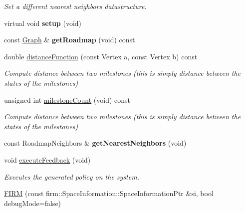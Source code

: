 \begin{DoxyCompactItemize}
\begin{DoxyCompactList}\small\item\em \-Set a different nearest neighbors datastructure. \end{DoxyCompactList}\item 
\hypertarget{class_f_i_r_m_a5c5c1fff3029a554dfddfd95bed17b10}{virtual void {\bfseries setup} (void)}\label{class_f_i_r_m_a5c5c1fff3029a554dfddfd95bed17b10}

\item 
\hypertarget{class_f_i_r_m_aacad0b0dfc1413f78c6dc76fdbac9ce7}{const \hyperlink{class_f_i_r_m_a687e9f4243b22c30ee1fa5da22a85053}{\-Graph} \& {\bfseries get\-Roadmap} (void) const }\label{class_f_i_r_m_aacad0b0dfc1413f78c6dc76fdbac9ce7}

\item 
\hypertarget{class_f_i_r_m_a9a98fdb0da781d77fe6ff9a55e8a7a34}{double \hyperlink{class_f_i_r_m_a9a98fdb0da781d77fe6ff9a55e8a7a34}{distance\-Function} (const \-Vertex a, const \-Vertex b) const }\label{class_f_i_r_m_a9a98fdb0da781d77fe6ff9a55e8a7a34}

\begin{DoxyCompactList}\small\item\em \-Compute distance between two milestones (this is simply distance between the states of the milestones) \end{DoxyCompactList}\item 
\hypertarget{class_f_i_r_m_a558fbb0135ab096d3cd06e65b88533de}{unsigned int \hyperlink{class_f_i_r_m_a558fbb0135ab096d3cd06e65b88533de}{milestone\-Count} (void) const }\label{class_f_i_r_m_a558fbb0135ab096d3cd06e65b88533de}

\begin{DoxyCompactList}\small\item\em \-Compute distance between two milestones (this is simply distance between the states of the milestones) \end{DoxyCompactList}\item 
\hypertarget{class_f_i_r_m_ad6df82888d88ab8479f92f9f3e453c2e}{const \-Roadmap\-Neighbors \& {\bfseries get\-Nearest\-Neighbors} (void)}\label{class_f_i_r_m_ad6df82888d88ab8479f92f9f3e453c2e}

\item 
\hypertarget{class_f_i_r_m_ae448791d4c9af9016bc9d5e9de166f0e}{void \hyperlink{class_f_i_r_m_ae448791d4c9af9016bc9d5e9de166f0e}{execute\-Feedback} (void)}\label{class_f_i_r_m_ae448791d4c9af9016bc9d5e9de166f0e}

\begin{DoxyCompactList}\small\item\em \-Executes the generated policy on the system. \end{DoxyCompactList}\item 
\hypertarget{class_f_i_r_m_a451aef223259f497ec178ad8447d04d5}{\hyperlink{class_f_i_r_m_a451aef223259f497ec178ad8447d04d5}{\-F\-I\-R\-M} (const firm\-::\-Space\-Information\-::\-Space\-Information\-Ptr \&si, bool debug\-Mode=false)}\label{class_f_i_r_m_a451aef223259f497ec178ad8447d04d5}


\end{DoxyCompactItemize}
